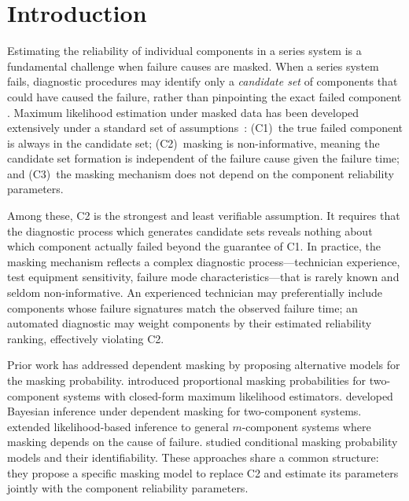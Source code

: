 \section{Introduction}
\label{sec:introduction}

Estimating the reliability of individual components in a series system is a
fundamental challenge when failure causes are masked. When a series system
fails, diagnostic procedures may identify only a \emph{candidate set} of
components that could have caused the failure, rather than pinpointing the
exact failed component \citep{Usher-1988}. Maximum likelihood estimation under
masked data has been developed extensively under a standard set of
assumptions~\citep{Lin-1993, towell2023reliability}: (C1)~the true failed
component is always in the candidate set; (C2)~masking is non-informative,
meaning the candidate set formation is independent of the failure cause given
the failure time; and (C3)~the masking mechanism does not depend on the
component reliability parameters.

Among these, C2 is the strongest and least verifiable assumption. It requires
that the diagnostic process which generates candidate sets reveals nothing
about which component actually failed beyond the guarantee of C1. In practice,
the masking mechanism reflects a complex diagnostic process---technician
experience, test equipment sensitivity, failure mode characteristics---that is
rarely known and seldom non-informative. An experienced technician may
preferentially include components whose failure signatures match the observed
failure time; an automated diagnostic may weight components by their estimated
reliability ranking, effectively violating C2.

Prior work has addressed dependent masking by proposing alternative models for
the masking probability. \citet{LinGuess1994} introduced proportional masking
probabilities for two-component systems with closed-form maximum likelihood
estimators. \citet{Guttman1995} developed Bayesian inference under dependent
masking for two-component systems. \citet{Mukhopadhyay2006} extended
likelihood-based inference to general $m$-component systems where masking
depends on the cause of failure. \citet{CraiuReiser2006} studied conditional
masking probability models and their identifiability. These approaches share a
common structure: they propose a specific masking model to replace C2 and
estimate its parameters jointly with the component reliability parameters.

